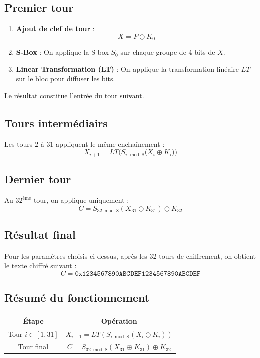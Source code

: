 \documentclass[12pt,a4paper]{report}
\begin{document}
\subsection{Premier tour}

\begin{enumerate}
    \item \textbf{Ajout de clef de tour} : 
    \[
        X = P \oplus K_0
    \]
    \item \textbf{S-Box} : On applique la S-box $S_0$ sur chaque groupe de 4 bits de $X$.
    \item \textbf{Linear Transformation (LT)} : On applique la transformation linéaire $LT$ sur le bloc pour diffuser les bits.
\end{enumerate}

Le résultat constitue l’entrée du tour suivant.

\subsection{Tours intermédiairs}

Les tours $2$ à $31$ appliquent le même enchaînement :
\[
    X_{i+1} = LT\Big(S_{i \bmod 8}\big(X_i \oplus K_i\big)\Big)
\]

\subsection{Dernier tour}

Au $32^{\text{ème}}$ tour, on applique uniquement :
\[
    C = S_{32 \bmod 8}(X_{31} \oplus K_{31}) \oplus K_{32}
\]

\subsection{Résultat final}

Pour les paramètres choisis ci-dessus, après les 32 tours de chiffrement, 
on obtient le texte chiffré suivant :
\[
    C = \texttt{0x1234567890ABCDEF1234567890ABCDEF}
\]

\subsection{Résumé du fonctionnement}

\begin{center}
\begin{tabular}{|c|c|}
\hline
\textbf{Étape} & \textbf{Opération} \\

\hline
Tour $i \in [1,31]$ & $X_{i+1} = LT(S_{i \bmod 8}(X_i \oplus K_i))$ \\
\hline
Tour final & $C = S_{32 \bmod 8}(X_{31} \oplus K_{31}) \oplus K_{32}$ \\
\hline
\end{tabular}
\end{center}
\end{document}
